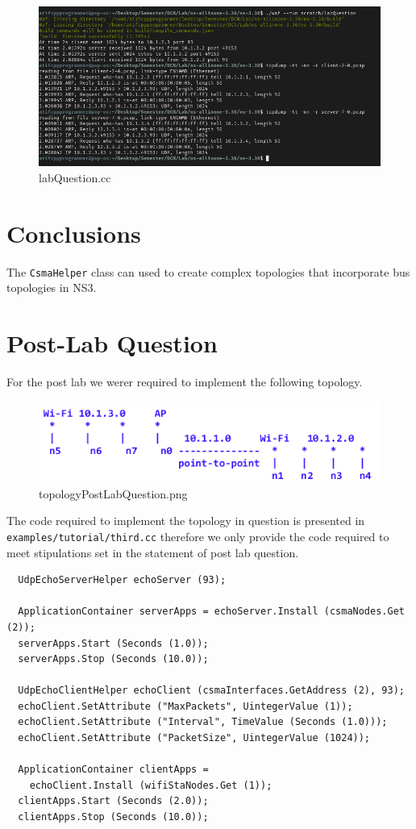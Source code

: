 \documentclass[fullpage]{article}
\begin{document}
\begin{figure}[H]
  \includegraphics[width=\linewidth]{labQuestion.png}
  \caption{labQuestion.cc}
  \label{fig:output2}
\end{figure}

\section{Conclusions}
The \verb|CsmaHelper| class can used to create complex topologies that
incorporate bus topologies in NS3.

\section{Post-Lab Question}
For the post lab we werer required to implement the following topology.

\begin{figure}[H]
  \includegraphics[width=\linewidth]{topologyPostLabQuestion.png}
  \caption{topologyPostLabQuestion.png}
  \label{fig:output2}
\end{figure}

The code required to implement the topology in question is presented in
\verb|examples/tutorial/third.cc| therefore we only provide the code required to
meet stipulations set in the statement of post lab question.

\begin{verbatim}
  UdpEchoServerHelper echoServer (93);

  ApplicationContainer serverApps = echoServer.Install (csmaNodes.Get (2));
  serverApps.Start (Seconds (1.0));
  serverApps.Stop (Seconds (10.0));

  UdpEchoClientHelper echoClient (csmaInterfaces.GetAddress (2), 93);
  echoClient.SetAttribute ("MaxPackets", UintegerValue (1));
  echoClient.SetAttribute ("Interval", TimeValue (Seconds (1.0)));
  echoClient.SetAttribute ("PacketSize", UintegerValue (1024));

  ApplicationContainer clientApps =
    echoClient.Install (wifiStaNodes.Get (1));
  clientApps.Start (Seconds (2.0));
  clientApps.Stop (Seconds (10.0));
\end{verbatim}
\end{document}
